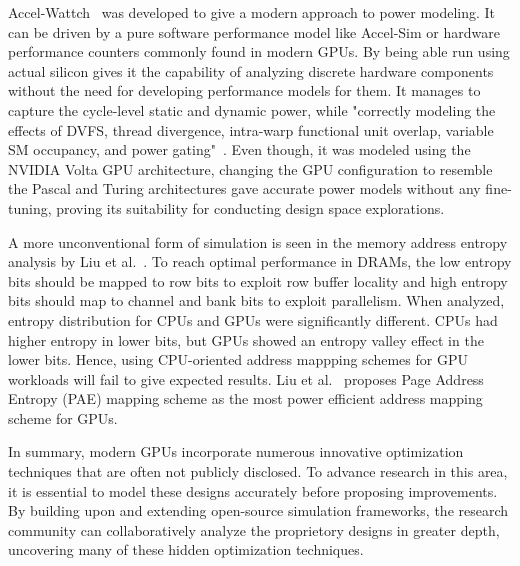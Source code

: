 Accel-Wattch~\cite{Kandiah2021} was developed to give a modern approach to power modeling.
It can be driven by a pure software performance model like Accel-Sim or hardware performance counters commonly found in modern GPUs.
By being able run using actual silicon gives it the capability of analyzing discrete hardware components without the need for developing performance models for them.
It manages to capture the cycle-level static and dynamic power, while "correctly modeling the effects of DVFS, thread divergence, intra-warp functional unit overlap, variable SM occupancy, and power gating"~\cite{Kandiah2021}.
Even though, it was modeled using the NVIDIA Volta GPU architecture, changing the GPU configuration to resemble the Pascal and Turing architectures gave accurate power models without any fine-tuning, proving its suitability for conducting design space explorations.

A more unconventional form of simulation is seen in the memory address entropy analysis by Liu et al.~\cite{Liu2018}.
To reach optimal performance in DRAMs, the low entropy bits should be mapped to row bits to exploit row buffer locality and high entropy bits should map to channel and bank bits to exploit parallelism.
When analyzed, entropy distribution for CPUs and GPUs were significantly different.
CPUs had higher entropy in lower bits, but GPUs showed an entropy valley effect in the lower bits.
Hence, using CPU-oriented address mappping schemes for GPU workloads will fail to give expected results.
Liu et al.~\cite{Liu2018} proposes Page Address Entropy (PAE) mapping scheme as the most power efficient address mapping scheme for GPUs.

In summary, modern GPUs incorporate numerous innovative optimization techniques that are often not publicly disclosed.
To advance research in this area, it is essential to model these designs accurately before proposing improvements.
By building upon and extending open-source simulation frameworks, the research community can collaboratively analyze the proprietory designs in greater depth, uncovering many of these hidden optimization techniques.
